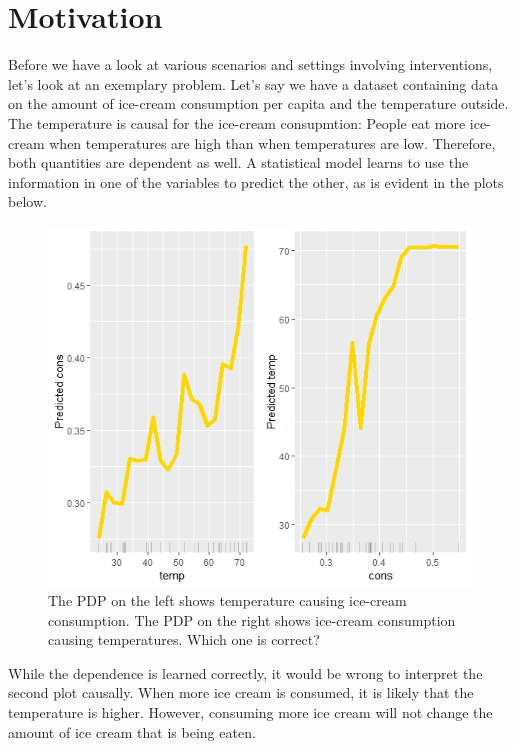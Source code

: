 \documentclass[]{krantz}
\begin{document}
\section{Motivation}\label{motivation}

Before we have a look at various scenarios and settings involving
interventions, let's look at an exemplary problem. Let's say we have a
dataset containing data on the amount of ice-cream consumption per
capita and the temperature outside. The temperature is causal for the
ice-cream consupmtion: People eat more ice-cream when temperatures are
high than when temperatures are low. Therefore, both quantities are
dependent as well. A statistical model learns to use the information in
one of the variables to predict the other, as is evident in the plots
below.

\begin{figure}

\includegraphics[width=1\linewidth]{images/ice_cream} \hfill{}

\caption{The PDP on the left shows temperature causing ice-cream consumption. The PDP on the right shows ice-cream consumption causing temperatures. Which one is correct?}\label{fig:Figure1}
\end{figure}

While the dependence is learned correctly, it would be wrong to
interpret the second plot causally. When more ice cream is consumed, it
is likely that the temperature is higher. However, consuming more ice
cream will not change the amount of ice cream that is being eaten.
\end{document}
